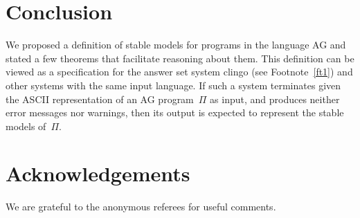 \documentclass{tlp}
\begin{document}
\section{Conclusion}

We proposed a definition of stable models for programs in the language AG and
stated a few theorems that facilitate reasoning about them.  This definition
can be viewed as a specification for the answer set
system {\sc clingo} (see Footnote~\ref{ft1}) and other systems with the
same input language.  If such a system terminates given the ASCII
representation of an AG program~$\Pi$ as input, and produces neither error
messages nor warnings, then its output is expected to represent the stable
models of~$\Pi$.

\section*{Acknowledgements}

We are grateful to the anonymous referees for useful comments.

\newpage

%
%
\end{document}
